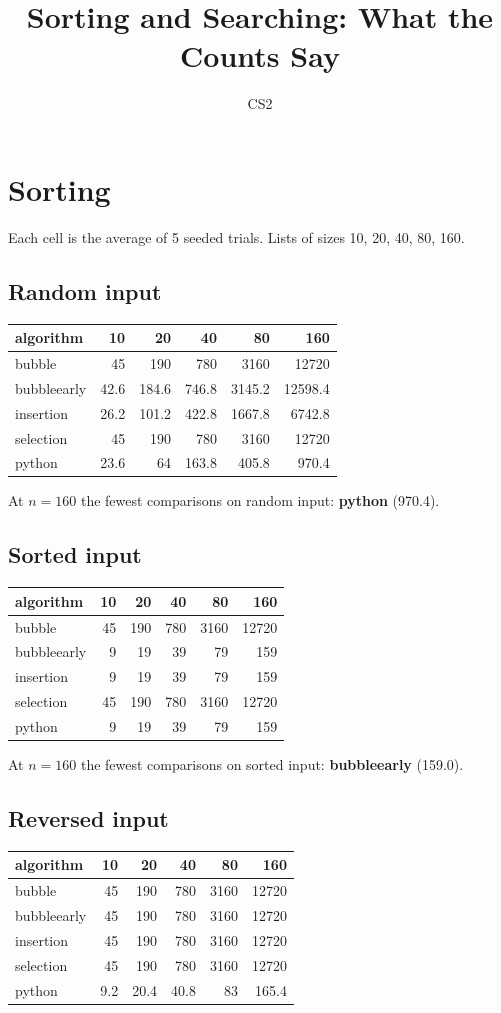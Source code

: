 \documentclass{article}
\begin{document}
\title{Sorting and Searching: What the Counts Say}
\author{CS2}
\date{}
\maketitle
\section{Sorting}
Each cell is the average of 5 seeded trials. Lists of sizes 10, 20, 40, 80, 160.
\subsection{Random input}
\begin{tabular}{lrrrrr}
\hline
algorithm & 10 & 20 & 40 & 80 & 160
\\
\hline
bubble & 45 & 190 & 780 & 3160 & 12720 \\
bubbleearly & 42.6 & 184.6 & 746.8 & 3145.2 & 12598.4 \\
insertion & 26.2 & 101.2 & 422.8 & 1667.8 & 6742.8 \\
selection & 45 & 190 & 780 & 3160 & 12720 \\
python & 23.6 & 64 & 163.8 & 405.8 & 970.4 \\
\hline
\end{tabular}

At $n=160$ the fewest comparisons on random input: \textbf{python} (970.4).

\subsection{Sorted input}
\begin{tabular}{lrrrrr}
\hline
algorithm & 10 & 20 & 40 & 80 & 160
\\
\hline
bubble & 45 & 190 & 780 & 3160 & 12720 \\
bubbleearly & 9 & 19 & 39 & 79 & 159 \\
insertion & 9 & 19 & 39 & 79 & 159 \\
selection & 45 & 190 & 780 & 3160 & 12720 \\
python & 9 & 19 & 39 & 79 & 159 \\
\hline
\end{tabular}

At $n=160$ the fewest comparisons on sorted input: \textbf{bubbleearly} (159.0).

\subsection{Reversed input}
\begin{tabular}{lrrrrr}
\hline
algorithm & 10 & 20 & 40 & 80 & 160
\\
\hline
bubble & 45 & 190 & 780 & 3160 & 12720 \\
bubbleearly & 45 & 190 & 780 & 3160 & 12720 \\
insertion & 45 & 190 & 780 & 3160 & 12720 \\
selection & 45 & 190 & 780 & 3160 & 12720 \\
python & 9.2 & 20.4 & 40.8 & 83 & 165.4 \\
\hline
\end{tabular}
\end{document}

